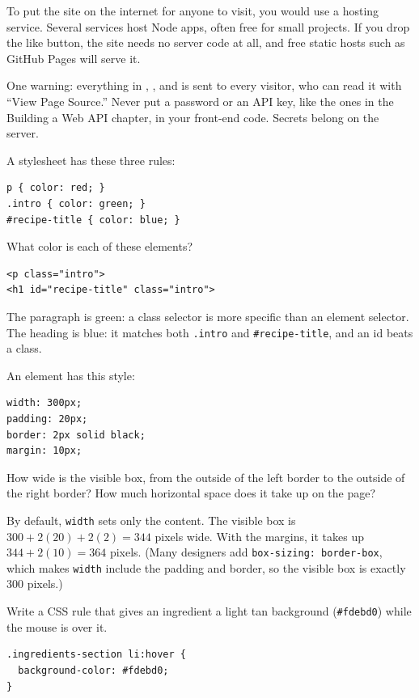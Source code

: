 To put the site on the internet for anyone to visit, you would use a hosting service. Several services
host Node apps, often free for small projects. If you drop the like button, the site needs no server code
at all, and free static hosts such as GitHub Pages will serve it.

One warning: everything in , , and  is sent to
every visitor, who can read it with ``View Page Source.'' Never put a password or an API key, like the ones
in the Building a Web API chapter, in your front-end code. Secrets belong on the server.

\begin{Exercise}[title={Which Color Wins?}, label=cj_cascade]
A stylesheet has these three rules:
\begin{verbatim}
p { color: red; }
.intro { color: green; }
#recipe-title { color: blue; }
\end{verbatim}
What color is each of these elements?
\begin{verbatim}
<p class="intro">
<h1 id="recipe-title" class="intro">
\end{verbatim}
\end{Exercise}
\begin{Answer}[ref=cj_cascade]
The paragraph is green: a class selector is more specific than an element selector. The heading is
blue: it matches both \verb|.intro| and \verb|#recipe-title|, and an id beats a class.
\end{Answer}

\begin{Exercise}[title={How Much Room?}, label=cj_box]
An element has this style:
\begin{verbatim}
width: 300px;
padding: 20px;
border: 2px solid black;
margin: 10px;
\end{verbatim}
How wide is the visible box, from the outside of the left border to the outside of
the right border? How much horizontal space does it take up on the page?
\end{Exercise}
\begin{Answer}[ref=cj_box]
By default, \verb|width| sets only the content. The visible box is $300 + 2(20) + 2(2) = 344$ pixels wide.
With the margins, it takes up $344 + 2(10) = 364$ pixels. (Many designers add
\verb|box-sizing: border-box|, which makes \verb|width| include the padding and border, so the visible box
is exactly 300 pixels.)
\end{Answer}

\begin{Exercise}[title={Highlight the Ingredient}, label=cj_hover]
Write a CSS rule that gives an ingredient a light tan background (\verb|#fdebd0|) while the mouse is over
it.
\end{Exercise}
\begin{Answer}[ref=cj_hover]
\begin{verbatim}
.ingredients-section li:hover {
  background-color: #fdebd0;
}
\end{verbatim}
\end{Answer}

